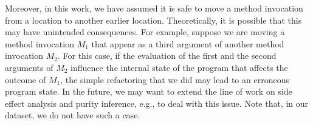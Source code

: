 Moreover, in this work, we have assumed it is safe to move a method invocation from a location to another earlier location. Theoretically, it is possible that this may have unintended consequences. For example, suppose we are moving a method invocation $M_1$ that appear as a third argument of another method invocation $M_2$. For this case, if the evaluation of the first and the second arguments of $M_2$  influence the internal state of the program that affects the outcome of $M_1$, the simple refactoring that we did may lead to an erroneous program state. In the future, we may want to extend the line of work on side effect analysis and purity inference, e.g.,  to deal with this issue. Note that, in our dataset, we do not have such a case. 
